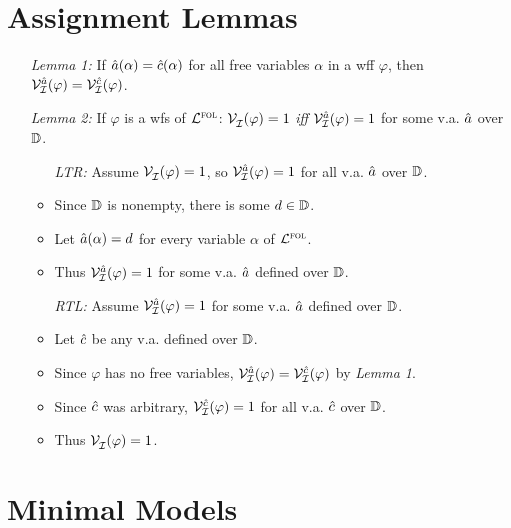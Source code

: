 \documentclass[a4paper, 11pt]{article} %
\begin{document}
\section*{Assignment Lemmas}

\begin{enumerate}
  \item[\it Lemma 1:] If $\hat{a}(\alpha)=\hat{c}(\alpha)$ for all free variables $\alpha$ in a wff $\varphi$, then $\mathcal{V}_{\mathcal{I}}^{\hat{a}}(\varphi)=\mathcal{V}_{\mathcal{I}}^{\hat{c}}(\varphi)$.
  \item[\it Lemma 2:] If $\varphi$ is a wfs of $\mathcal{L}^{\textsc{fol}}$: $\mathcal{V}_{\mathcal{I}}^{}(\varphi)= 1$ \textit{iff} $\mathcal{V}_{\mathcal{I}}^{\hat{a}}(\varphi)= 1$ for some v.a. $\hat{a}$ over $\mathbb{D}$.
    \begin{itemize}
      \item[\it LTR:] Assume $\mathcal{V}_{\mathcal{I}}^{}(\varphi)= 1$, so $\mathcal{V}_{\mathcal{I}}^{\hat{a}}(\varphi)= 1$ for all v.a. $\hat{a}$ over $\mathbb{D}$.
      \item Since $\mathbb{D}$ is nonempty, there is some $d \in \mathbb{D}$.
      \item Let $\hat{a}(\alpha) = d$ for every variable $\alpha$ of $\mathcal{L}^{\textsc{fol}}$.
      \item Thus $\mathcal{V}_{\mathcal{I}}^{\hat{a}}(\varphi)= 1$ for some v.a. $\hat{a}$ defined over $\mathbb{D}$.
      \item[\it RTL:] Assume $\mathcal{V}_{\mathcal{I}}^{\hat{a}}(\varphi)=1$ for some v.a. $\hat{a}$ defined over $\mathbb{D}$.
      \item Let $\hat{c}$ be any v.a. defined over $\mathbb{D}$.
      \item Since $\varphi$ has no free variables, $\mathcal{V}_{\mathcal{I}}^{\hat{a}}(\varphi)=\mathcal{V}_{\mathcal{I}}^{\hat{c}}(\varphi)$ by \textit{Lemma 1}.
      \item Since $\hat{c}$ was arbitrary, $\mathcal{V}_{\mathcal{I}}^{\hat{c}}(\varphi)=1$ for all v.a. $\hat{c}$ over $\mathbb{D}$.
      \item Thus $\mathcal{V}_{\mathcal{I}}^{}(\varphi)=1$.
    \end{itemize}
\end{enumerate}



\section*{Minimal Models}
\end{document}
